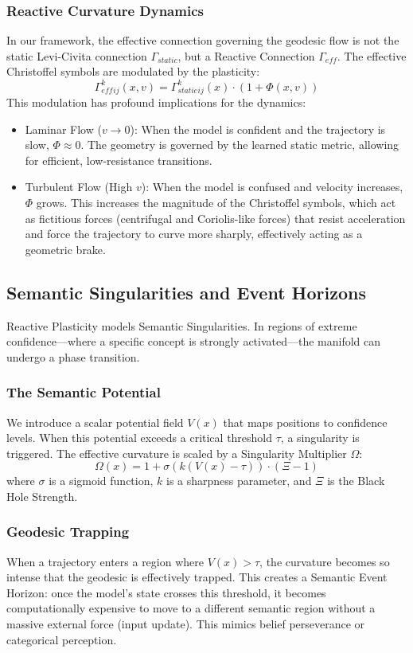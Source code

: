 \documentclass{article}
\numberwithin{equation}{section}
\begin{document}
\subsubsection{Reactive Curvature Dynamics}
In our framework, the effective connection governing the geodesic flow is not the static Levi-Civita connection $\Gamma_{static}$, but a Reactive Connection $\Gamma_{eff}$. The effective Christoffel symbols are modulated by the plasticity:
\[
\Gamma_{eff}^k_{ij}(x, v) = \Gamma_{static}^k_{ij}(x) \cdot (1 + \Phi(x, v))
\]
This modulation has profound implications for the dynamics:
\begin{itemize}
\item Laminar Flow ($v \to 0$): When the model is confident and the trajectory is slow, $\Phi \approx 0$. The geometry is governed by the learned static metric, allowing for efficient, low-resistance transitions.
\item Turbulent Flow (High $v$): When the model is confused and velocity increases, $\Phi$ grows. This increases the magnitude of the Christoffel symbols, which act as fictitious forces (centrifugal and Coriolis-like forces) that resist acceleration and force the trajectory to curve more sharply, effectively acting as a geometric brake.
\end{itemize}

\subsection{Semantic Singularities and Event Horizons}
Reactive Plasticity models Semantic Singularities. In regions of extreme confidence---where a specific concept is strongly activated---the manifold can undergo a phase transition.

\subsubsection{The Semantic Potential}
We introduce a scalar potential field $V(x)$ that maps positions to confidence levels. When this potential exceeds a critical threshold $\tau$, a singularity is triggered. The effective curvature is scaled by a Singularity Multiplier $\Omega$:
\[
\Omega(x) = 1 + \sigma(k(V(x) - \tau)) \cdot (\Xi - 1)
\]
where $\sigma$ is a sigmoid function, $k$ is a sharpness parameter, and $\Xi$ is the Black Hole Strength.

\subsubsection{Geodesic Trapping}
When a trajectory enters a region where $V(x) > \tau$, the curvature becomes so intense that the geodesic is effectively trapped. This creates a Semantic Event Horizon: once the model's state crosses this threshold, it becomes computationally expensive to move to a different semantic region without a massive external force (input update). This mimics belief perseverance or categorical perception.
\end{document}
